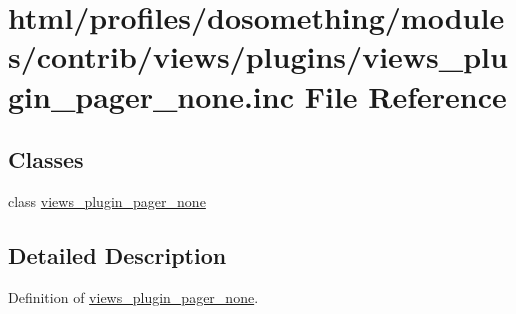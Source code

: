 \hypertarget{views__plugin__pager__none_8inc}{
\section{html/profiles/dosomething/modules/contrib/views/plugins/views\_\-plugin\_\-pager\_\-none.inc File Reference}
\label{views__plugin__pager__none_8inc}
}
\subsection*{Classes}
\begin{DoxyCompactItemize}
\item 
class \hyperlink{classviews__plugin__pager__none}{views\_\-plugin\_\-pager\_\-none}
\end{DoxyCompactItemize}


\subsection{Detailed Description}
Definition of \hyperlink{classviews__plugin__pager__none}{views\_\-plugin\_\-pager\_\-none}. 
